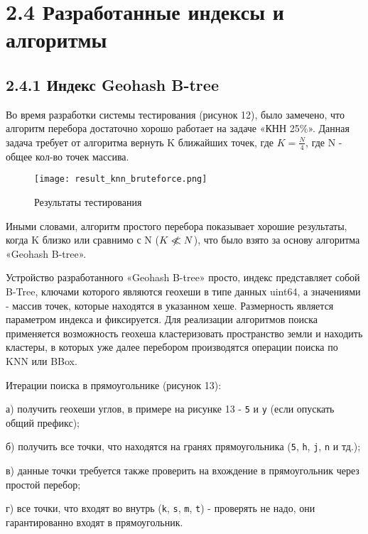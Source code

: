 \section{2.4 Разработанные индексы и алгоритмы}

\subsection{2.4.1 Индекс Geohash B-tree}
Во время разработки системы тестирования (рисунок 12), было замечено, что алгоритм перебора достаточно хорошо работает на задаче «КНН 25\%». Данная задача требует от алгоритма вернуть K ближайших точек, где $K = \frac{N}{4}$, где N - общее кол-во точек массива. 

\par\vspace{1em}
\begin{figure}[H]
    \centering
    \texttt{[image: result\_knn\_bruteforce.png]}
    \caption{Результаты тестирования}
\end{figure}
\par\vspace{1em}
 
Иными словами, алгоритм простого перебора показывает хорошие результаты, когда K близко или сравнимо с N ($K \centernot \ll N$), что было взято за основу алгоритма «Geohash B-tree». 

Устройство разработанного «Geohash B-tree» просто, индекс представляет собой B-Tree\cite{comerBTree}, ключами которого являются геохеши в типе данных uint64, а значениями - массив точек, которые находятся в указанном хеше. Размерность является параметром индекса и фиксируется. Для реализации алгоритмов поиска применяется возможность геохеша кластеризовать пространство земли и находить кластеры, в которых уже далее перебором производятся операции поиска по KNN или BBox\cite{gulakovStructured}.

Итерации поиска в прямоугольнике (рисунок 13):
\par а) получить геохеши углов, в примере на рисунке 13 - \texttt{5} и \texttt{y} (если опускать общий префикс);
\par б) получить все точки, что находятся на гранях прямоугольника (\texttt{5}, \texttt{h}, \texttt{j}, \texttt{n} и тд.);
\par в) данные точки требуется также проверить на вхождение в прямоугольник через простой перебор;
\par г) все точки, что входят во внутрь (\texttt{k}, \texttt{s}, \texttt{m}, \texttt{t}) - проверять не надо, они гарантированно входят в прямоугольник.

